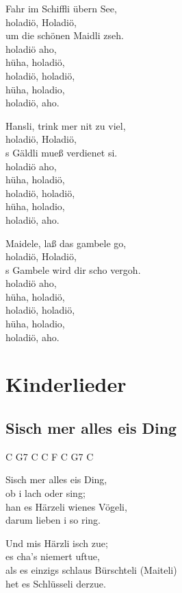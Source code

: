 \documentclass[
  letterpaper,
  twoside=false]{scrbook}
\begin{document}
Fahr im Schiffli übern See,\\
holadiö, Holadiö,\\
um die schönen Maidli zseh.\\
holadiö aho,\\
hüha, holadiö,\\
holadiö, holadiö,\\
hüha, holadio,\\
holadiö, aho.

Hansli, trink mer nit zu viel,\\
holadiö, Holadiö,\\
\textquotesingle s Gäldli mueß verdienet si.\\
holadiö aho,\\
hüha, holadiö,\\
holadiö, holadiö,\\
hüha, holadio,\\
holadiö, aho.

Maidele, laß das gambele go,\\
holadiö, Holadiö,\\
\textquotesingle s Gambele wird dir scho vergoh.\\
holadiö aho,\\
hüha, holadiö,\\
holadiö, holadiö,\\
hüha, holadio,\\
holadiö, aho.

\part{Kinderlieder}

\hypertarget{sisch-mer-alles-eis-ding}{%
\chapter{S\textquotesingle isch mer alles eis
Ding}\label{sisch-mer-alles-eis-ding}}

C G7 C C F C G7 C

S\textquotesingle isch mer alles eis Ding,\\
ob i lach oder sing;\\
han es Härzeli wienes Vögeli,\\
darum lieben i so ring.

Und mis Härzli isch zue;\\
es cha's niemert uftue,\\
als es einzigs schlaus Bürschteli (Maiteli)\\
het es Schlüsseli derzue.
\end{document}
